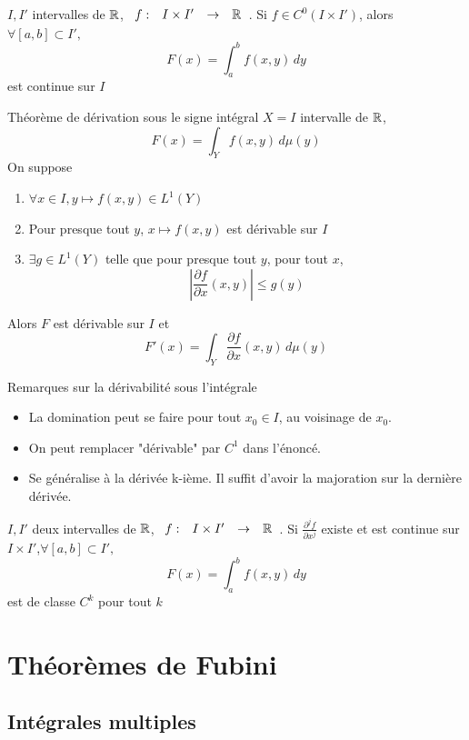\documentclass[]{report}
\begin{document}
\begin{cor}{}{}
    $I,I'$ intervalles de $\mathbb{R}$, $\begin{array}{ccccc} f : & I\times I' & \to & \mathbb{R} \end{array}$. Si $f \in C^0(I\times I')$, alors $\forall [a,b]\subset I',$
    \[F(x)=\int_{a}^{b} f(x,y)\, dy\]
    est continue sur $I$
\end{cor}

\begin{tm}{Théorème de dérivation sous le signe intégral}{}
    $X=I$ intervalle de $\mathbb{R}$,
    \[F(x)=\int_Y f(x,y)\, d\mu(y)\]
    On suppose
    \begin{enumerate}
        \item $\forall x\in I,y\mapsto f(x,y)\in L^1(Y)$
        \item Pour presque tout $y$, $x\mapsto f(x,y)$ est dérivable sur $I$
        \item $\exists g\in L^1(Y)$ telle que pour presque tout $y$, pour tout $x$,
              \[\left|\frac{\partial f}{\partial x} (x,y)\right|\le g(y)\]
    \end{enumerate}
    Alors $F$ est dérivable sur $I$ et
    \[F'(x)=\int_Y \frac{\partial f}{\partial x}(x,y) \, d\mu(y)\]
\end{tm}

\begin{re}{Remarques sur la dérivabilité sous l'intégrale}{}
    \begin{itemize}
        \item La domination peut se faire pour tout $x_0\in I$, au voisinage de $x_0$.
        \item On peut remplacer "dérivable" par $C^1$ dans l'énoncé.
        \item Se généralise à la dérivée k-ième. Il suffit d'avoir la majoration sur la dernière dérivée.
    \end{itemize}
\end{re}

\begin{cor}{}{}
    $I,I'$ deux intervalles de $\mathbb{R}$, $\begin{array}{ccccc} f : & I\times I' & \to & \mathbb{R} \end{array}$. Si $\frac{\partial^j f}{\partial x^j}$ existe et est continue sur $I\times I'$,$\forall [a,b]\subset I',$
    \[F(x)=\int_{a}^{b} f(x,y)\, dy\]
    est de classe $C^k$ pour tout $k$
\end{cor}

\chapter{Théorèmes de Fubini}

\section{Intégrales multiples}
\end{document}
